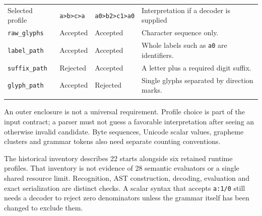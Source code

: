 \documentclass[
  11pt,
]{article}
\begin{document}
\begin{longtable}[]{@{}
  >{\raggedright\arraybackslash}p{}
  >{\raggedright\arraybackslash}p{}
  >{\raggedright\arraybackslash}p{}
  >{\raggedright\arraybackslash}p{}@{}}
\toprule\noalign{}
\begin{minipage}[b]{\linewidth}\raggedright
Selected profile
\end{minipage} & \begin{minipage}[b]{\linewidth}\raggedright
\texttt{a\textgreater{}b\textgreater{}c\textgreater{}a}
\end{minipage} & \begin{minipage}[b]{\linewidth}\raggedright
\texttt{a0\textgreater{}b2\textgreater{}c1\textgreater{}a0}
\end{minipage} & \begin{minipage}[b]{\linewidth}\raggedright
Interpretation if a decoder is supplied
\end{minipage} \\*
\midrule\noalign{}
\endhead
\bottomrule\noalign{}
\endlastfoot
\nolinkurl{raw_glyphs} & Accepted & Accepted & Character sequence only. \\*
\nolinkurl{label_path} & Accepted & Accepted & Whole labels such as
\nolinkurl{a0} are identifiers. \\*
\nolinkurl{suffix_path} & Rejected & Accepted & A letter plus a required
digit suffix. \\*
\nolinkurl{glyph_path} & Accepted & Rejected & Single glyphs separated by
direction marks. \\*
\end{longtable}

An outer enclosure is not a universal requirement. Profile choice is
part of the input contract; a parser must not guess a favorable
interpretation after seeing an otherwise invalid candidate. Byte
sequences, Unicode scalar values, grapheme clusters and grammar tokens
also need separate counting conventions.

The historical inventory describes 22 starts alongside six retained
runtime profiles. That inventory is not evidence of 28 semantic
evaluators or a single shared resource limit. Recognition, AST
construction, decoding, evaluation and exact serialization are distinct
checks. A scalar syntax that accepts \texttt{a:1/0} still needs a
decoder to reject zero denominators unless the grammar itself has been
changed to exclude them.
\end{document}
